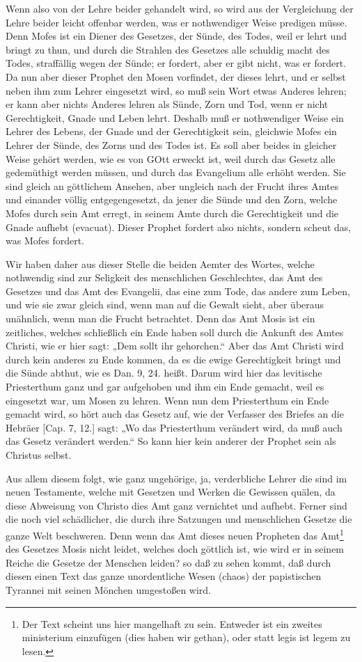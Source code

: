 Wenn also von der Lehre beider gehandelt wird, so wird aus der Vergleichung der Lehre beider leicht offenbar werden, was er nothwendiger Weise predigen müsse. Denn Mofes ist ein Diener des Gesetzes, der Sünde, des Todes, weil er lehrt und bringt zu thun, und durch die Strahlen des Gesetzes alle schuldig macht des Todes, straffällig wegen der Sünde; er fordert, aber er gibt nicht, was er fordert. Da nun aber dieser Prophet den Mosen vorfindet, der dieses lehrt, und er selbst neben ihm zum Lehrer eingesetzt wird, so muß sein Wort etwas Anderes lehren; er kann aber nichts Anderes lehren als Sünde, Zorn und Tod, wenn er nicht Gerechtigkeit, Gnade und Leben lehrt. Deshalb muß er nothwendiger Weise ein Lehrer des Lebens, der Gnade und der Gerechtigkeit sein, gleichwie Mofes ein Lehrer der Sünde, des Zorns und des Todes ist. Es soll aber beides in gleicher Weise gehört werden, wie es von GOtt erweckt ist, weil durch das Gesetz alle gedemüthigt werden müssen, und durch das Evangelium alle erhöht werden. Sie sind gleich an göttlichem Ansehen, aber ungleich nach der Frucht ihres Amtes und einander völlig entgegengesetzt, da jener die Sünde und den Zorn, welche Mofes durch sein Amt erregt, in seinem Amte durch die Gerechtigkeit und die Gnade aufhebt (evacuat). Dieser Prophet fordert also nichts, sondern scheut das, was Mofes fordert.

Wir haben daher aus dieser Stelle die beiden Aemter des Wortes, welche nothwendig sind zur Seligkeit des menschlichen Geschlechtes, das Amt des Gesetzes und das Amt des Evangelii, das eine zum Tode, das andere zum Leben, und wie sie zwar gleich sind, wenn man auf die Gewalt sieht, aber überaus unähnlich, wenn man die Frucht betrachtet. Denn das Amt Mosis ist ein zeitliches, welches schließlich ein Ende haben soll durch die Ankunft des Amtes Christi, wie er hier sagt: „Dem sollt ihr gehorchen.“ Aber das Amt Christi wird durch kein anderes zu Ende kommen, da es die ewige Gerechtigkeit bringt und die Sünde abthut, wie es Dan. 9, 24. heißt. Darum wird hier das levitische Priesterthum ganz und gar aufgehoben und ihm ein Ende gemacht, weil es eingesetzt war, um Mosen zu lehren. Wenn nun dem Priesterthum ein Ende gemacht wird, so hört auch das Gesetz auf, wie der Verfasser des Briefes an die Hebräer [Cap. 7, 12.] sagt: „Wo das Priesterthum verändert wird, da muß auch das Gesetz verändert werden.“ So kann hier kein anderer der Prophet sein als Christus selbst.

Aus allem diesem folgt, wie ganz ungehörige, ja, verderbliche Lehrer die sind im neuen Testamente, welche mit Gesetzen und Werken die Gewissen quälen, da diese Abweisung von Christo dies Amt ganz vernichtet und aufhebt. Ferner sind die noch viel schädlicher, die durch ihre Satzungen und menschlichen Gesetze die ganze Welt beschweren. Denn wenn das Amt dieses neuen Propheten das Amt\footnote{Der Text scheint uns hier mangelhaft zu sein. Entweder ist ein zweites ministerium einzufügen (dies haben wir gethan), oder statt legis ist legem zu lesen.} des Gesetzes Mosis nicht leidet, welches doch göttlich ist, wie wird er in seinem Reiche die Gesetze der Menschen leiden? so daß zu sehen kommt, daß durch diesen einen Text das ganze unordentliche Wesen (chaos) der papistischen Tyrannei mit seinen Mönchen umgestoßen wird.

